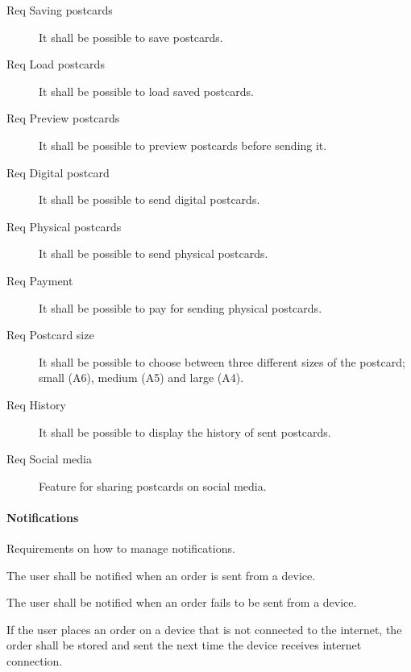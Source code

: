 \documentclass[10pt,a4paper]{article}
\begin{document}
\begin{description}
	\item [Req  Saving postcards] It shall be possible to save postcards.
	\item [Req  Load postcards] It shall be possible to load saved postcards.
	
	\item [Req  Preview postcards] It shall be possible to preview postcards before sending it.
	
	\item [Req  Digital postcard] It shall be possible to send digital postcards.
	\item [Req  Physical postcards] It shall be possible to send physical postcards.
	
	\item [Req  Payment] It shall be possible to pay for sending physical postcards.
	
	\item [Req  Postcard size] It shall be possible to choose between three different sizes of the postcard; small (A6), medium (A5) and large (A4).
	\item [Req  History] It shall be possible to display the history of sent postcards.
	
	\item [Req  Social media] Feature for sharing postcards on social media.
\end{description}

\paragraph{Notifications}
Requirements on how to manage notifications.

\begin{description}
	\item [Req \thesubsubsection {.\theproduct} Success notification] The user shall be notified when an order is sent from a device.
	\item [Req \thesubsubsection {.\theproduct} Fail notification] The user shall be notified when an order fails to be sent from a device.

	\item [Req \thesubsubsection {.\theproduct} No internet] If the user places an order on a device that is not connected to the internet, the order shall be stored and sent the next time the device receives internet connection. 
\end{description}
\end{document}
